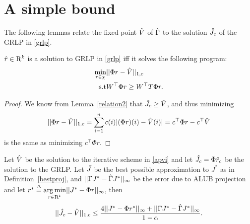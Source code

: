 \section{A simple bound}
The following lemmas relate the fixed point $\hat{V}$ of $\hat{\Gamma}$ to the solution $\hat{J}_c$ of the GRLP in \eqref{grlp}.
\begin{lemma}\label{srw}
$\hat{r} \in \mathrm{R}^k$ is a solution to GRLP in \eqref{grlp} iff it solves the following program:
\begin{align}\label{grlpeqprog}
\min_{r\in \chi} &||\Phi r-\hv||_{1,c}\nn\\
\text{s.t}\mb & W^\top \Phi r\geq W^\top T \Phi r.
\end{align}
\end{lemma}
\begin{proof}
We know from Lemma~\ref{relation2} that $\hat{J}_c\geq\hat{V}$, and thus minimizing 
\begin{align*}
||\Phi r-\hat{V}||_{1,c}=\sum_{i=1}^n c(i) |(\Phi r)(i)-\hat{V}(i)|=c^\top \Phi r-c^\top \hat{V}
\end{align*} 
is the same as minimizing $c^\top \Phi r$.
\end{proof}
\begin{theorem}\label{mt2}
Let $\hat{V}$ be the solution to the iterative scheme in \eqref{apvi} and let $\hat{J}_c=\Phi \hat{r}_c$ be the solution to the GRLP. Let $\bar{J}$ be the best possible approximation to $J^*$ as in Definition~\ref{bestproj}, and $||\Gamma J^* -\hat{\Gamma} J^*||_\infty$ be the error due to ALUB projection and let $r^*\stackrel{\Delta}{=}\underset{r\in \mathrm{R}^k}{\arg\min}||J^*-\Phi r||_\infty$, then
\begin{align}
||\hat{J}_c-\hat{V}||_{1,c}\leq\frac{4||J^*-\Phi r^*||_\infty+||\Gamma J^*-\hat{\Gamma} J^*||_\infty}{1-\alpha}.
\end{align}
\end{theorem}
